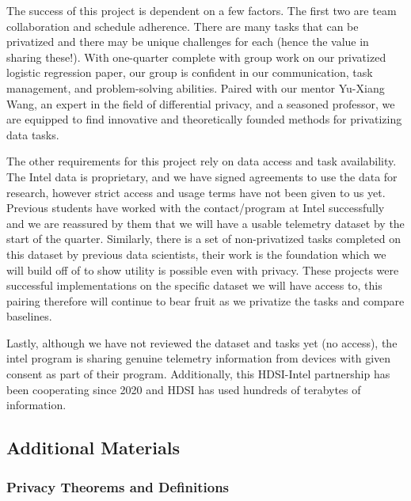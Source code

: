 \documentclass[12pt,letterpaper]{article}
\begin{document}
The success of this project is dependent on a few factors. The first two are team collaboration and schedule adherence. There are many tasks that can be privatized and there may be unique challenges for each (hence the value in sharing these!). With one-quarter complete with group work on our privatized logistic regression paper, our group is confident in our communication, task management, and problem-solving abilities. Paired with our mentor Yu-Xiang Wang, an expert in the field of differential privacy, and a seasoned professor, we are equipped to find innovative and theoretically founded methods for privatizing data tasks.

The other requirements for this project rely on data access and task availability. The Intel data is proprietary, and we have signed agreements to use the data for research, however strict access and usage terms have not been given to us yet. Previous students have worked with the contact/program at Intel successfully and we are reassured by them that we will have a usable telemetry dataset by the start of the quarter.  Similarly, there is a set of non-privatized tasks completed on this dataset by previous data scientists, their work is the foundation which we will build off of to show utility is possible even with privacy. These projects were successful implementations on the specific dataset we will have access to, this pairing therefore will continue to bear fruit as we privatize the tasks and compare baselines. 

Lastly, although we have not reviewed the dataset and tasks yet (no access), the intel program is sharing genuine telemetry information from devices with given consent as part of their program. Additionally, this HDSI-Intel partnership has been cooperating since 2020 and HDSI has used hundreds of terabytes of information.


\subsection{Additional Materials}

\subsubsection{Privacy Theorems and Definitions}
\end{document}
